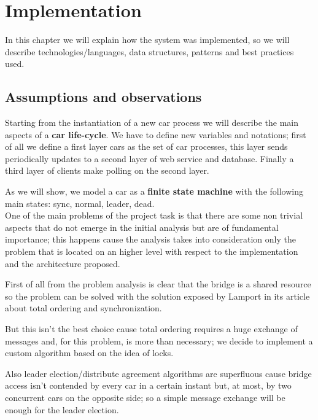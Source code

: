 \chapter{Implementation}\label{ch:implementation}

In this chapter we will explain how the system was implemented, so we will describe 
technologies/languages, data structures, patterns and best practices used.

\section{Assumptions and observations}

Starting from the instantiation of a new car process we will describe the main aspects 
of a \textbf{car life-cycle}. 
\noindent
We have to define new variables and notations; first of all we define a first layer cars as
 the set of car processes, this layer sends periodically updates to a second layer of web service and 
database. Finally a third layer of clients make polling on the second layer.

As we will show, we model a car as a \textbf{finite state machine} 
with the following main states: sync, normal, leader, dead.\\

\noindent
One of the main problems of the project task is that there are some non trivial aspects 
that do not emerge in the initial analysis but are of fundamental importance; 
this happens cause the analysis takes into consideration only the problem 
that is located on an higher level with respect to the implementation and the 
architecture proposed.

First of all from the problem analysis is clear that the bridge is a shared resource 
so the problem can be solved with the solution exposed by Lamport in its 
article~\cite{Lamport:1978} about total ordering and synchronization. 

But this isn't the best choice cause total ordering requires a huge exchange of 
messages and, for this problem, is more than necessary; we decide to implement a 
custom algorithm based on the idea of locks.

Also leader election/distribute agreement algorithms are superfluous cause bridge 
access isn't contended by every car in a certain instant but, at most, 
by two concurrent cars on the opposite side; so a simple message exchange 
will be enough for the leader election. \\

